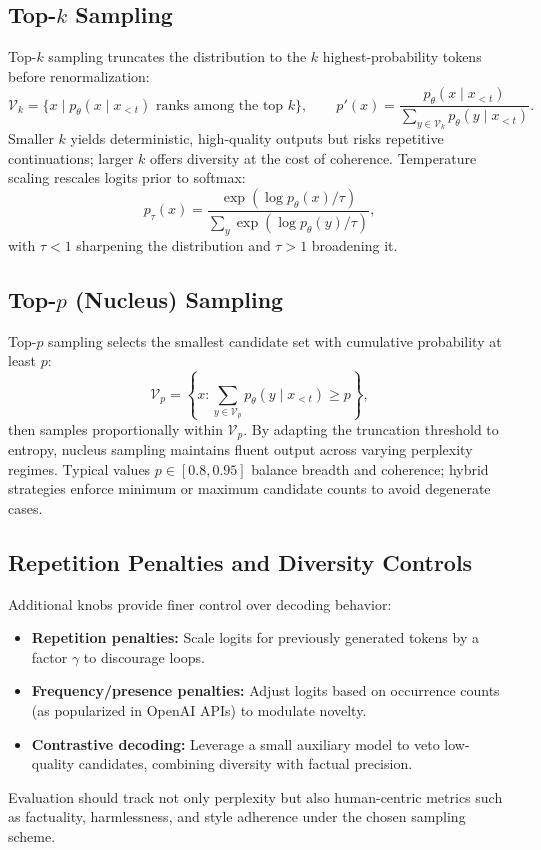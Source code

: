 \documentclass{article}
\begin{document}
\subsection{Top-$k$ Sampling}
Top-$k$ sampling truncates the distribution to the $k$ highest-probability tokens before renormalization:
\begin{equation}
  \mathcal{V}_k = \{x \mid p_\theta(x \mid x_{<t}) \text{ ranks among the top } k\}, \qquad
  p'(x) = \frac{p_\theta(x \mid x_{<t})}{\sum_{y \in \mathcal{V}_k} p_\theta(y \mid x_{<t})}.
\end{equation}
Smaller $k$ yields deterministic, high-quality outputs but risks repetitive continuations; larger $k$ offers diversity at the cost of coherence. Temperature scaling rescales logits prior to softmax:
\begin{equation}
  p_\tau(x) = \frac{\exp(\log p_\theta(x)/\tau)}{\sum_{y} \exp(\log p_\theta(y)/\tau)},
\end{equation}
with $\tau < 1$ sharpening the distribution and $\tau > 1$ broadening it.

\subsection{Top-$p$ (Nucleus) Sampling}
Top-$p$ sampling selects the smallest candidate set with cumulative probability at least $p$:
\begin{equation}
  \mathcal{V}_p = \left\{ x : \sum_{y \in \mathcal{V}_p} p_\theta(y \mid x_{<t}) \ge p \right\},
\end{equation}
then samples proportionally within $\mathcal{V}_p$. By adapting the truncation threshold to entropy, nucleus sampling maintains fluent output across varying perplexity regimes. Typical values $p \in [0.8, 0.95]$ balance breadth and coherence; hybrid strategies enforce minimum or maximum candidate counts to avoid degenerate cases.

\subsection{Repetition Penalties and Diversity Controls}
Additional knobs provide finer control over decoding behavior:
\begin{itemize}
  \item \textbf{Repetition penalties:} Scale logits for previously generated tokens by a factor $\gamma$ to discourage loops.
  \item \textbf{Frequency/presence penalties:} Adjust logits based on occurrence counts (as popularized in OpenAI APIs) to modulate novelty.
  \item \textbf{Contrastive decoding:} Leverage a small auxiliary model to veto low-quality candidates, combining diversity with factual precision.
\end{itemize}
Evaluation should track not only perplexity but also human-centric metrics such as factuality, harmlessness, and style adherence under the chosen sampling scheme.
\end{document}
